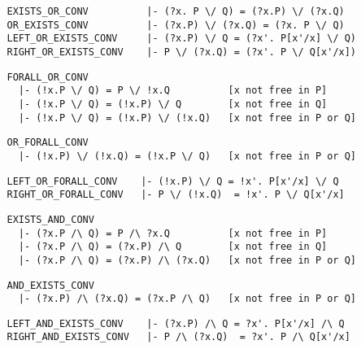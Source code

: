 \begin{hol}\begin{verbatim}
   EXISTS_OR_CONV          |- (?x. P \/ Q) = (?x.P) \/ (?x.Q)
   OR_EXISTS_CONV          |- (?x.P) \/ (?x.Q) = (?x. P \/ Q)
   LEFT_OR_EXISTS_CONV     |- (?x.P) \/ Q = (?x'. P[x'/x] \/ Q)
   RIGHT_OR_EXISTS_CONV    |- P \/ (?x.Q) = (?x'. P \/ Q[x'/x])
\end{verbatim}\end{hol}

\begin{hol}\begin{verbatim}
   FORALL_OR_CONV 
     |- (!x.P \/ Q) = P \/ !x.Q          [x not free in P]
     |- (!x.P \/ Q) = (!x.P) \/ Q        [x not free in Q]
     |- (!x.P \/ Q) = (!x.P) \/ (!x.Q)   [x not free in P or Q]
\end{verbatim}\end{hol}

\begin{hol}\begin{verbatim}
   OR_FORALL_CONV  
     |- (!x.P) \/ (!x.Q) = (!x.P \/ Q)   [x not free in P or Q]
\end{verbatim}\end{hol}

\begin{hol}\begin{verbatim}
   LEFT_OR_FORALL_CONV    |- (!x.P) \/ Q = !x'. P[x'/x] \/ Q
   RIGHT_OR_FORALL_CONV   |- P \/ (!x.Q)  = !x'. P \/ Q[x'/x]
\end{verbatim}\end{hol}

\begin{hol}\begin{verbatim}
   EXISTS_AND_CONV 
     |- (?x.P /\ Q) = P /\ ?x.Q          [x not free in P]
     |- (?x.P /\ Q) = (?x.P) /\ Q        [x not free in Q]
     |- (?x.P /\ Q) = (?x.P) /\ (?x.Q)   [x not free in P or Q]
\end{verbatim}\end{hol}

\begin{hol}\begin{verbatim}
   AND_EXISTS_CONV  
     |- (?x.P) /\ (?x.Q) = (?x.P /\ Q)   [x not free in P or Q]
\end{verbatim}\end{hol}

\begin{hol}\begin{verbatim}
   LEFT_AND_EXISTS_CONV    |- (?x.P) /\ Q = ?x'. P[x'/x] /\ Q
   RIGHT_AND_EXISTS_CONV   |- P /\ (?x.Q)  = ?x'. P /\ Q[x'/x]
\end{verbatim}\end{hol}

